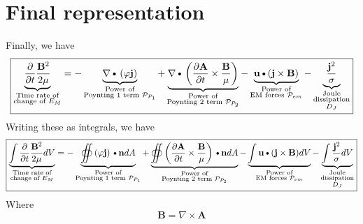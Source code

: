 \documentclass[11pt]{article}
\newcommand{\A}{\mathbf{A}}
\newcommand{\B}{\mathbf{B}}
\newcommand{\PD}{\partial}
\newcommand{\BM}{\frac{\mathbf{B}}{\mu}}
\newcommand{\J}{\mathbf{j}}
\newcommand{\N}{\mathbf{n}}
\newcommand{\JSS}{\frac{\mathbf{j}^2}{\sigma}}
\newcommand{\U}{\mathbf{u}}
\newcommand{\DOT}{\text{\textbullet}}
\begin{document}
\section{Final representation}
Finally, we have
\begin{equation}
	\boxed{
	\underbrace{\frac{\PD }{\PD t} \frac{\B^2}{2 \mu}}_
	{\substack{\text{Time rate of}\\\text{change of $E_M$}}}
	=
	- \underbrace{\nabla \DOT \left(\varphi \J \right) }_
	{\substack{\text{Power of}\\\text{Poynting 1 term $\mathcal P_{P_1}$}}}
	+ \underbrace{\nabla \DOT \left( \frac{\PD \A}{\PD t} \times \BM \right)}_
	{\substack{\text{Power of}\\\text{Poynting 2 term $\mathcal P_{P_2}$}}}
	- \underbrace{\U \DOT (\J \times \B)}_
	{\substack{\text{Power of}\\\text{EM forces $\mathcal P_{em}$}}}
	- \underbrace{\JSS}_
	{\substack{\text{Joule}\\\text{dissipation}\\\text{$D_J$}}}
	}
\end{equation}
Writing these as integrals, we have
\begin{equation}
	\boxed{
	\underbrace{\int \frac{\PD }{\PD t} \frac{\B^2}{2 \mu} dV}_
	{\substack{\text{Time rate of}\\\text{change of $E_M$}}}
	=
	- \underbrace{\oiint \left(\varphi \J \right) \DOT \N dA }_
	{\substack{\text{Power of}\\\text{Poynting 1 term $\mathcal P_{P_1}$}}}
	+ \underbrace{\oiint \left( \frac{\PD \A}{\PD t} \times \BM \right)\DOT \N dA }_
	{\substack{\text{Power of}\\\text{Poynting 2 term $\mathcal P_{P_2}$}}}
	- \underbrace{\int \U \DOT (\J \times \B) dV}_
	{\substack{\text{Power of}\\\text{EM forces $\mathcal P_{em}$}}}
	- \underbrace{\int \JSS dV}_
	{\substack{\text{Joule}\\\text{dissipation}\\\text{$D_J$}}}
	}
\end{equation}
Where
\begin{equation}
	\B = \nabla \times \A
\end{equation}
\end{document}
